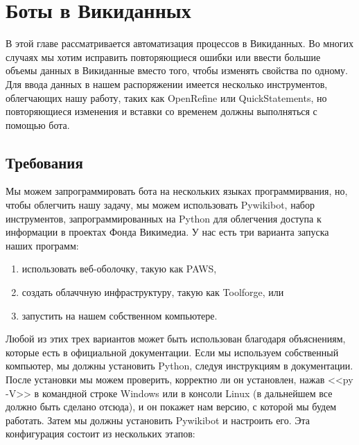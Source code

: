 \chapter{Боты в Викиданных}
\label{ch:bots}
В этой главе рассматривается автоматизация процессов в Викиданных. Во многих случаях мы хотим исправить повторяющиеся ошибки или ввести большие объемы данных в Викиданные вместо того, чтобы изменять свойства по одному. Для ввода данных в нашем распоряжении имеется несколько инструментов, облегчающих нашу работу, таких как OpenRefine или QuickStatements, но повторяющиеся изменения и вставки со временем должны выполняться с помощью бота.

\section{Требования}
\label{sec:requirements}
Мы можем запрограммировать бота на нескольких языках программирвания, но, чтобы облегчить нашу задачу, мы можем использовать Pywikibot, набор инструментов, запрограммированных на Python для облегчения доступа к информации в проектах Фонда Викимедиа. У нас есть три варианта запуска наших программ:
\begin{enumerate}
  \setlength{\itemindent}{2em}
  \item использовать веб-оболочку, такую как PAWS,
  \item создать облаччную инфраструктуру, такую как Toolforge, или 
  \item запустить на нашем собственном компьютере.
\end{enumerate}

Любой из этих трех вариантов может быть использован благодаря объяснениям, которые есть в официальной документации. Если мы используем собственный компьютер, мы должны установить Python, следуя инструкциям в документации. После установки мы можем проверить, корректно ли он установлен, нажав <<py -V>> в командной строке Windows или в консоли Linux (в дальнейшем все должно быть сделано отсюда), и он покажет нам версию, с которой мы будем работать. Затем мы должны установить Pywikibot и настроить его. Эта конфигурация состоит из нескольких этапов:

